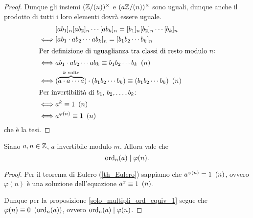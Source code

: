 \begin{proof}
    Dunque gli insiemi $\inverses{\Z/(n)}$ e $\inverses{a\Z/(n)}$ sono uguali, dunque anche il prodotto di tutti i loro elementi dovrà essere uguale.
    \begin{alignat*}
        {1}
        &[ab_1]_n[ab_2]_n\cdots [ab_k]_n = [b_1]_n[b_2]_n\cdots [b_k]_n\\
        \iff &[ab_1 \cdot ab_2 \cdots ab_k]_n = [b_1b_2\cdots b_k]_n\\
        \intertext{Per definizione di uguaglianza tra classi di resto modulo $n$:}
        \iff &ab_1 \cdot ab_2 \cdots ab_k \equiv b_1b_2\cdots b_k \Mod{n} \\
        \iff &(\overbrace{a\cdot a \cdots a}^{k \text{ volte}}) \cdot (b_1b_2\cdots b_k) \equiv (b_1b_2\cdots b_k) \Mod{n}\\
        \intertext{Per invertibilità di $b_1$, $b_2, \dots, b_k$:}
        \iff &a^k \equiv 1 \Mod{n}\\
        \iff &a^{\varphi(n)} \equiv 1 \Mod{n}
    \end{alignat*}
    che è la tesi.
\end{proof}

\begin{proposition}
    Siano $a, n \in \Z$, $a$ invertibile modulo $m$. Allora vale che \[
        \ord{a}{n} \divides \varphi(n).    
    \]
\end{proposition}
\begin{proof}
    Per il teorema di Eulero (\ref{th_Eulero}) sappiamo che $a^{\varphi(n)} \equiv 1 \Mod{n}$, ovvero $\varphi(n)$ è una soluzione dell'equazione $a^x \equiv 1 \Mod{n}$. 
    
    Dunque per la proposizione \ref{solo_multipli_ord_equiv_1} segue che $\varphi(n) \equiv 0 \Mod{\ord{a}{n}}$, ovvero $\ord{a}{n} \divides \varphi(n)$.
\end{proof}